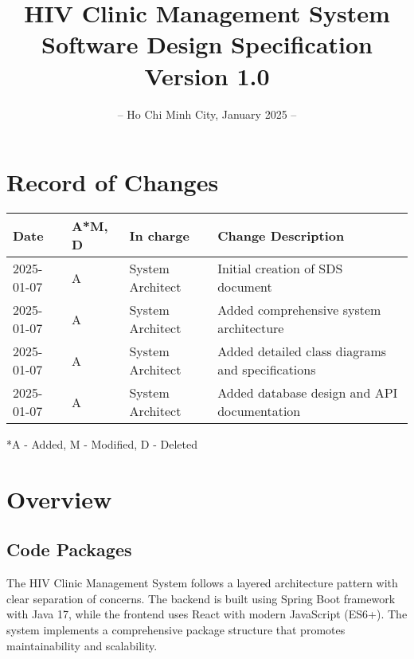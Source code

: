 \documentclass[12pt,a4paper]{article}
\title{
    \vspace{-2cm}
    \Huge\textbf{HIV Clinic Management System}\\
    \vspace{1cm}
    \Large\textbf{Software Design Specification}\\
    \vspace{2cm}
    \normalsize Version 1.0
}
\author{}
\date{
    \vspace{4cm}
    – Ho Chi Minh City, January 2025 –
}
\begin{document}
\maketitle
\thispagestyle{empty}

\newpage

\section*{Record of Changes}
\begin{longtable}{|p{3cm}|p{2cm}|p{3cm}|p{6cm}|}
\hline
\textbf{Date} & \textbf{A*M, D} & \textbf{In charge} & \textbf{Change Description} \\
\hline
2025-01-07 & A & System Architect & Initial creation of SDS document \\
\hline
2025-01-07 & A & System Architect & Added comprehensive system architecture \\
\hline
2025-01-07 & A & System Architect & Added detailed class diagrams and specifications \\
\hline
2025-01-07 & A & System Architect & Added database design and API documentation \\
\hline
\end{longtable}

\footnotesize{*A - Added, M - Modified, D - Deleted}

\newpage

\tableofcontents

\newpage

\section{Overview}

\subsection{Code Packages}

The HIV Clinic Management System follows a layered architecture pattern with clear separation of concerns. The backend is built using Spring Boot framework with Java 17, while the frontend uses React with modern JavaScript (ES6+). The system implements a comprehensive package structure that promotes maintainability and scalability.
\end{document}
